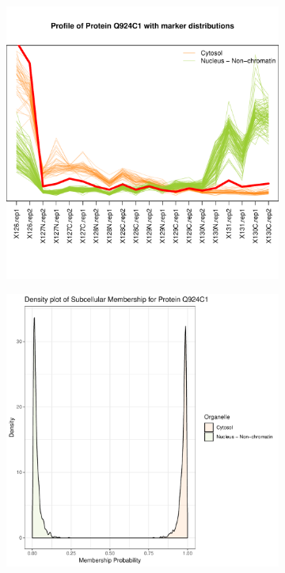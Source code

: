 \documentclass[12pt,english]{article}\usepackage[]{graphicx}\usepackage[]{color}
\makeatletter
\def\maxwidth{ %
  \ifdim\Gin@nat@width>\linewidth
    \linewidth
  \else
    \Gin@nat@width
  \fi
}
\newenvironment{knitrout}{}{} %
\makeatother
\begin{document}
\begin{figure}[h]
\begin{subfigure}[t]{0.5\textwidth}
\begin{knitrout}
{\centering \includegraphics[width=\maxwidth]{figure/Q924C1-prof-1} 

}



\end{knitrout}
    \caption{}
  \end{subfigure}
  \vspace{1cm}
  \begin{subfigure}[t]{0.5\textwidth}
    \centering
\begin{knitrout}
\color{fgcolor}

{\centering \includegraphics[width=\maxwidth]{figure/Q924C1-dens-1} 

}
\end{knitrout}
\end{subfigure}
\end{figure}
\end{document}
